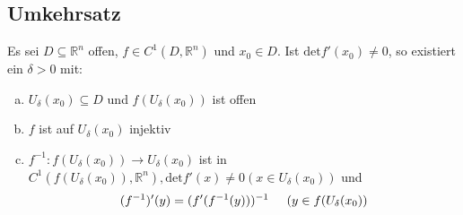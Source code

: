 \subsection{Umkehrsatz}
Es sei $D \subseteq \mathbb{R}^n$ offen, $f \in C^1(D, \mathbb{R}^n)$ und $x_0 \in D$. Ist $\text{det}f'(x_0) \neq 0$, so existiert ein
$\delta > 0$ mit:
\begin{enumerate} [a)]
    \item $U_\delta(x_0) \subseteq D$ und $f(U_\delta(x_0))$ ist offen
    \item $f$ ist auf $U_\delta(x_0)$ injektiv
    \item $f^{-1}: f(U_\delta(x_0)) \to U_\delta(x_0)$ ist in $C^1(f(U_\delta(x_0)),\mathbb{R}^n), \text{det}f'(x) \neq 0 (x \in U_\delta(x_0))$ und
    \begin{align*}
        (f^{-1})'(y) = (f'(f^{-1}(y)))^{-1} \hspace{0.5cm} (y \in f(U_\delta(x_0))
    \end{align*}
\end{enumerate}